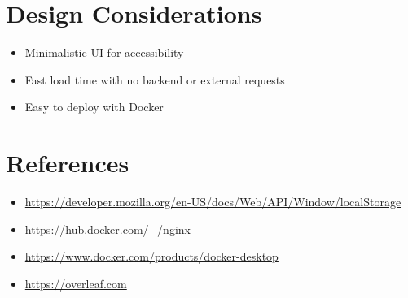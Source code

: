 \documentclass[12pt]{article}
\begin{document}
\section{Design Considerations}
\begin{itemize}
  \item Minimalistic UI for accessibility
  \item Fast load time with no backend or external requests
  \item Easy to deploy with Docker
\end{itemize}

\section{References}
\begin{itemize}
  \item \url{https://developer.mozilla.org/en-US/docs/Web/API/Window/localStorage}
  \item \url{https://hub.docker.com/_/nginx}
  \item \url{https://www.docker.com/products/docker-desktop}
  \item \url{https://overleaf.com}
\end{itemize}
\end{document}
